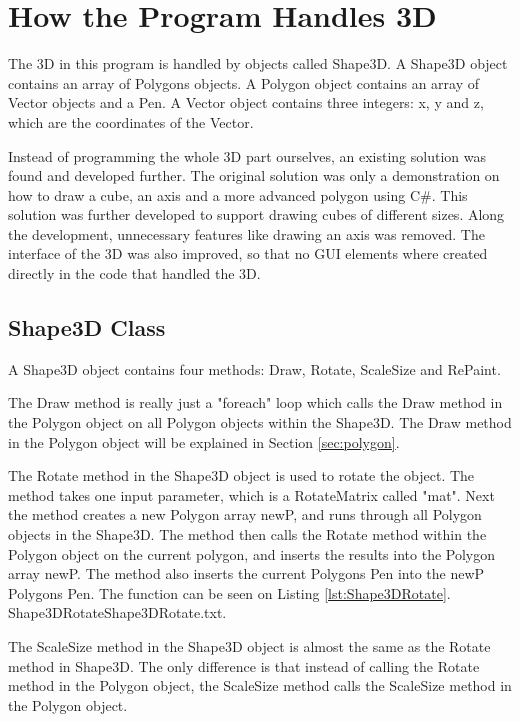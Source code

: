 \section{How the Program Handles 3D}
\label{sec:3DHandler}
The 3D in this program is handled by objects called Shape3D. A Shape3D object contains an array of Polygons objects. A Polygon object contains an array of Vector objects and a Pen. A Vector object contains three integers: x, y and z, which are the coordinates of the Vector. 

Instead of programming the whole 3D part ourselves, an existing solution was found and developed further. The original solution \citep{orgcode} was only a demonstration on how to draw a cube, an axis and a more advanced polygon using C\#. This solution was further developed to support drawing cubes of different sizes. Along the development, unnecessary features like drawing an axis was removed. The interface of the 3D was also improved, so that no GUI elements where created directly in the code that handled the 3D.

\subsection{Shape3D Class}
A Shape3D object contains four methods: Draw, Rotate, ScaleSize and RePaint.

The Draw method is really just a "foreach" loop which calls the Draw method in the Polygon object on all Polygon objects within the Shape3D. The Draw method in the Polygon object will be explained in Section \ref{sec:polygon}.

The Rotate method in the Shape3D object is used to rotate the object. The method takes one input parameter, which is a RotateMatrix called "mat". Next the method creates a new Polygon array newP, and runs through all Polygon objects in the Shape3D. The method then calls the Rotate method within the Polygon object on the current polygon, and inserts the results into the Polygon array newP. The method also inserts the current Polygons Pen into the newP Polygons Pen. The function can be seen on Listing \ref{lst:Shape3DRotate}.
 {Shape3DRotate}{Shape3DRotate.txt}.

The ScaleSize method in the Shape3D object is almost the same as the Rotate method in Shape3D. The only difference is that instead of calling the Rotate method in the Polygon object, the ScaleSize method calls the ScaleSize method in the Polygon object.

